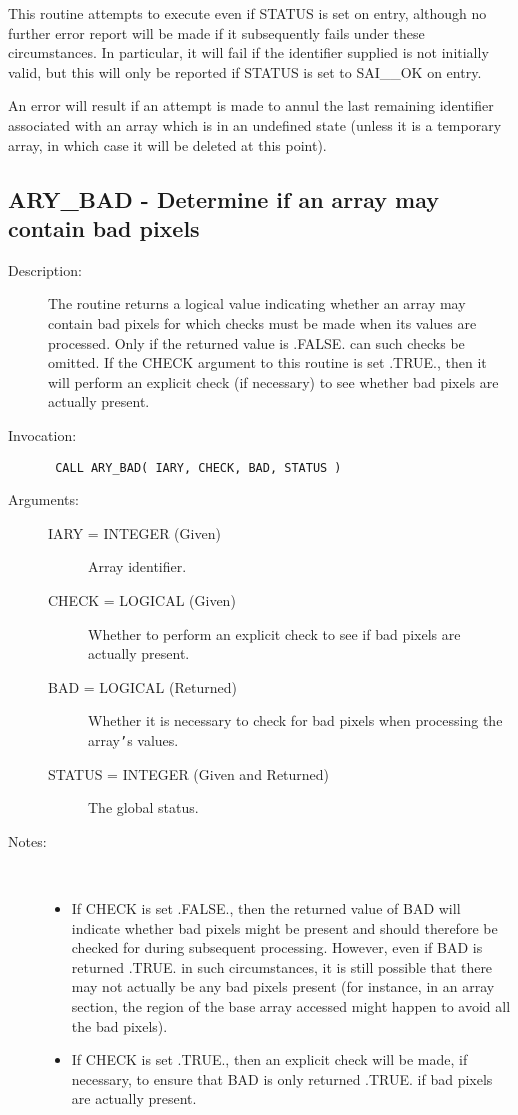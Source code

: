 \documentclass[twoside,11pt]{article}
\newcommand{\xlabel}[1]{}
\newlength{\sstbannerlength}
\newlength{\sstcaptionlength}
\newlength{\sstexampleslength}
\newlength{\sstexampleswidth}
\newcommand{\sstroutine}[3]{
   \goodbreak
   \rule{\textwidth}{0.5mm}
   \vspace{-7ex}
   \newline
   \settowidth{\sstbannerlength}{{\Large {\bf #1}}}
   \setlength{\sstcaptionlength}{\textwidth}
   \setlength{\sstexampleslength}{\textwidth}
   \addtolength{\sstbannerlength}{0.5em}
   \addtolength{\sstcaptionlength}{-2.0\sstbannerlength}
   \addtolength{\sstcaptionlength}{-5.0pt}
   \settowidth{\sstexampleswidth}{{\bf Examples:}}
   \addtolength{\sstexampleslength}{-\sstexampleswidth}
   \parbox[t]{\sstbannerlength}{\flushleft{\Large {\bf #1}}}
   \parbox[t]{\sstcaptionlength}{\center{\Large #2}}
   \parbox[t]{\sstbannerlength}{\flushright{\Large {\bf #1}}}
   \begin{description}
      #3
   \end{description}
}
\newcommand{\sstdescription}[1]{\item[Description:] #1}
\newcommand{\sstinvocation}[1]{\item[Invocation:]\hspace{0.4em}{\tt #1}}
\newcommand{\sstarguments}[1]{
   \item[Arguments:] \mbox{} \\
   \vspace{-3.5ex}
   \begin{description}
      #1
   \end{description}
}
\newcommand{\sstsubsection}[1]{ \item[{#1}] \mbox{} \\}
\newcommand{\sstnotes}[1]{\item[Notes:] \mbox{} \\[1.3ex] #1}
\newcommand{\sstitemlist}[1]{
  \mbox{} \\
  \vspace{-3.5ex}
  \begin{itemize}
     #1
  \end{itemize}
}
\newcommand{\sstitem}{\item}
\newcommand{\ssttt}{\tt}
\renewcommand{\sstroutine}[3]{
      \subsection{#1\xlabel{#1}-\label{#1}#2}
      \begin{description}
         #3
      \end{description}
   }
\renewcommand{\sstdescription}[1]{\item[Description:]
      \begin{description}
         #1
      \end{description}
   }
\renewcommand{\sstinvocation}[1]{\item[Invocation:]
      \begin{description}
         {\ssttt #1}
      \end{description}
   }
\renewcommand{\sstarguments}[1]{
      \item[Arguments:]
      \begin{description}
         #1
      \end{description}
   }
\renewcommand{\sstsubsection}[1]{\item[{#1}]}
\renewcommand{\sstnotes}[1]{\item[Notes:]
      \begin{description}
         #1
      \end{description}
   }
\newcommand{\sstitemlist}[1]{
      \begin{itemize}
         #1
      \end{itemize}
   }
\begin{document}
\begin{eqn*}
{{{         \sstitem
         This routine attempts to execute even if STATUS is set on
         entry, although no further error report will be made if it
         subsequently fails under these circumstances. In particular, it
         will fail if the identifier supplied is not initially valid, but
         this will only be reported if STATUS is set to SAI\_\_OK on entry.

         \sstitem
         An error will result if an attempt is made to annul the last
         remaining identifier associated with an array which is in an
         undefined state (unless it is a temporary array, in which case it
         will be deleted at this point).
      }
   }
}
\sstroutine{
   ARY\_BAD
}{
   Determine if an array may contain bad pixels
}{
   \sstdescription{
      The routine returns a logical value indicating whether an array
      may contain bad pixels for which checks must be made when its
      values are processed. Only if the returned value is .FALSE. can
      such checks be omitted.  If the CHECK argument to this routine is
      set .TRUE., then it will perform an explicit check (if necessary)
      to see whether bad pixels are actually present.
   }
   \sstinvocation{
      CALL ARY\_BAD( IARY, CHECK, BAD, STATUS )
   }
   \sstarguments{
      \sstsubsection{
         IARY = INTEGER (Given)
      }{
         Array identifier.
      }
      \sstsubsection{
         CHECK = LOGICAL (Given)
      }{
         Whether to perform an explicit check to see if bad pixels are
         actually present.
      }
      \sstsubsection{
         BAD = LOGICAL (Returned)
      }{
         Whether it is necessary to check for bad pixels when processing
         the array{\tt '}s values.
      }
      \sstsubsection{
         STATUS = INTEGER (Given and Returned)
      }{
         The global status.
      }
   }
   \sstnotes{
      \sstitemlist{

         \sstitem
         If CHECK is set .FALSE., then the returned value of BAD will
         indicate whether bad pixels might be present and should therefore
         be checked for during subsequent processing. However, even if BAD
         is returned .TRUE. in such circumstances, it is still possible
         that there may not actually be any bad pixels present (for
         instance, in an array section, the region of the base array
         accessed might happen to avoid all the bad pixels).

         \sstitem
         If CHECK is set .TRUE., then an explicit check will be made,
         if necessary, to ensure that BAD is only returned .TRUE. if bad
         pixels are actually present.

}}}
\end{eqn*}
\end{document}
